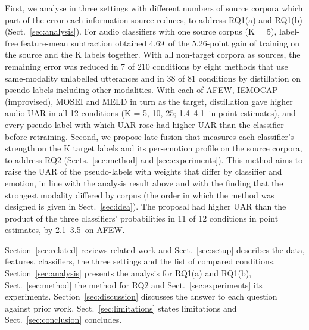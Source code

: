 First, we analyse in three settings with different numbers of source corpora which part of the error each information source reduces, to address RQ1(a) and RQ1(b) (Sect.~\ref{sec:analysis}). For audio classifiers with one source corpus (K = 5), label-free feature-mean subtraction obtained 4.69\pt\ of the 5.26-point gain of training on the source and the K labels together. With all non-target corpora as sources, the remaining error was reduced in 7 of 210 conditions by eight methods that use same-modality unlabelled utterances and in 38 of 81 conditions by distillation on pseudo-labels including other modalities. With each of AFEW, IEMOCAP (improvised), MOSEI and MELD in turn as the target, distillation gave higher audio UAR in all 12 conditions (K = 5, 10, 25; 1.4--4.1\pt\ in point estimates), and every pseudo-label with which UAR rose had higher UAR than the classifier before retraining. Second, we propose late fusion that measures each classifier's strength on the K target labels and its per-emotion profile on the source corpora, to address RQ2 (Sects.~\ref{sec:method} and \ref{sec:experiments}). This method aims to raise the UAR of the pseudo-labels with weights that differ by classifier and emotion, in line with the analysis result above and with the finding that the strongest modality differed by corpus (the order in which the method was designed is given in Sect.~\ref{sec:idea}). The proposal had higher UAR than the product of the three classifiers' probabilities in 11 of 12 conditions in point estimates, by 2.1--3.5\pt\ on AFEW.

Section~\ref{sec:related} reviews related work and Sect.~\ref{sec:setup} describes the data, features, classifiers, the three settings and the list of compared conditions. Section~\ref{sec:analysis} presents the analysis for RQ1(a) and RQ1(b), Sect.~\ref{sec:method} the method for RQ2 and Sect.~\ref{sec:experiments} its experiments. Section~\ref{sec:discussion} discusses the answer to each question against prior work, Sect.~\ref{sec:limitations} states limitations and Sect.~\ref{sec:conclusion} concludes.
